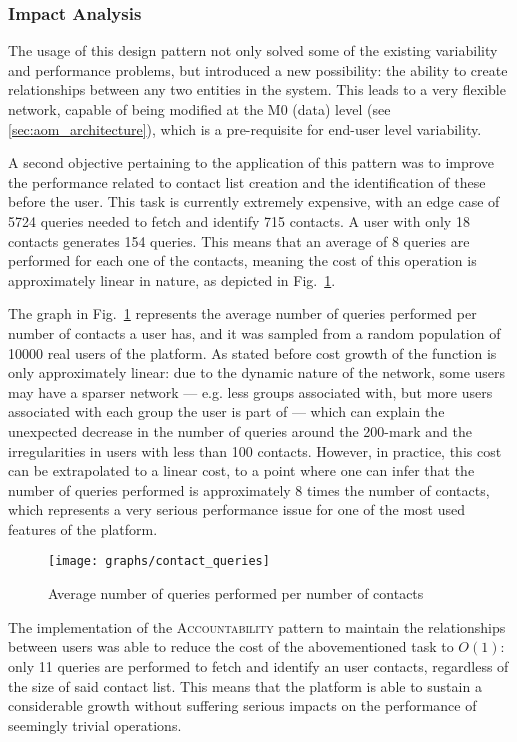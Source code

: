 \subsubsection{Impact Analysis}\label{sec:fa_social_network_impact_analysis}

The usage of this design pattern not only solved some of the existing variability and performance problems, but introduced a new possibility: the ability to create relationships between any two entities in the system. This leads to a very flexible network, capable of being modified at the M0 (data) level (see \ref{sec:aom_architecture}), which is a pre-requisite for end-user level variability.

A second objective pertaining to the application of this pattern was to improve the performance related to contact list creation and the identification of these before the user. This task is currently extremely expensive, with an edge case of 5724 queries needed to fetch and identify 715 contacts. A user with only 18 contacts generates 154 queries. This means that an average of 8 queries are performed for each one of the contacts, meaning the cost of this operation is approximately linear in nature, as depicted in Fig.~\ref{fig:contact_queries}. 

The graph in Fig.~\ref{fig:contact_queries} represents the average number of queries performed per number of contacts a user has, and it was sampled from a random population of 10000 real users of the platform. As stated before cost growth of the function is only approximately linear: due to the dynamic nature of the network, some users may have a sparser network --- e.g. less groups associated with, but more users associated with each group the user is part of --- which can explain the unexpected decrease in the number of queries around the 200-mark and the irregularities in users with less than 100 contacts. However, in practice, this cost can be extrapolated to a linear cost, to a point where one can infer that the number of queries performed is approximately 8 times the number of contacts, which represents a very serious performance issue for one of the most used features of the platform.


\begin{figure}[H]
  \centering
  \texttt{[image: graphs/contact\_queries]}
  \caption{Average number of queries performed per number of contacts}
  \label{fig:contact_queries}
\end{figure}

The implementation of the \textsc{Accountability} pattern to maintain the relationships between users was able to reduce the cost of the abovementioned task to $O(1)$: only 11 queries are performed to fetch and identify an user contacts, regardless of the size of said contact list. This means that the platform is able to sustain a considerable growth without suffering serious impacts on the performance of seemingly trivial operations.

